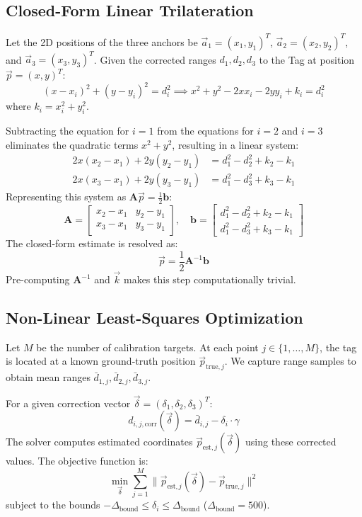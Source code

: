 \documentclass[11pt,a4paper]{article}
\begin{document}
\subsection{Closed-Form Linear Trilateration}
Let the 2D positions of the three anchors be $\vec{a}_1 = (x_1, y_1)^T$, $\vec{a}_2 = (x_2, y_2)^T$, and $\vec{a}_3 = (x_3, y_3)^T$. Given the corrected ranges $d_1, d_2, d_3$ to the Tag at position $\vec{p} = (x, y)^T$:
\begin{equation}
    (x - x_i)^2 + (y - y_i)^2 = d_i^2 \implies x^2 + y^2 - 2x x_i - 2y y_i + k_i = d_i^2
\end{equation}
where $k_i = x_i^2 + y_i^2$. 

Subtracting the equation for $i=1$ from the equations for $i=2$ and $i=3$ eliminates the quadratic terms $x^2 + y^2$, resulting in a linear system:
\begin{align}
    2x(x_2 - x_1) + 2y(y_2 - y_1) &= d_1^2 - d_2^2 + k_2 - k_1 \\
    2x(x_3 - x_1) + 2y(y_3 - y_1) &= d_1^2 - d_3^2 + k_3 - k_1
\end{align}
Representing this system as $\mathbf{A} \vec{p} = \frac{1}{2} \mathbf{b}$:
\begin{equation}
    \mathbf{A} = \begin{bmatrix} x_2 - x_1 & y_2 - y_1 \\ x_3 - x_1 & y_3 - y_1 \end{bmatrix}, \quad 
    \mathbf{b} = \begin{bmatrix} d_1^2 - d_2^2 + k_2 - k_1 \\ d_1^2 - d_3^2 + k_3 - k_1 \end{bmatrix}
\end{equation}
The closed-form estimate is resolved as:
\begin{equation}
    \vec{p} = \frac{1}{2} \mathbf{A}^{-1} \mathbf{b}
\end{equation}
Pre-computing $\mathbf{A}^{-1}$ and $\vec{k}$ makes this step computationally trivial.

\subsection{Non-Linear Least-Squares Optimization}
Let $M$ be the number of calibration targets. At each point $j \in \{1,\dots,M\}$, the tag is located at a known ground-truth position $\vec{p}_{\text{true}, j}$. We capture range samples to obtain mean ranges $\bar{d}_{1,j}, \bar{d}_{2,j}, \bar{d}_{3,j}$.

For a given correction vector $\vec{\delta} = (\delta_1, \delta_2, \delta_3)^T$:
\begin{equation}
    d_{i,j,\text{corr}}(\vec{\delta}) = \bar{d}_{i,j} - \delta_i \cdot \gamma
\end{equation}
The solver computes estimated coordinates $\vec{p}_{\text{est}, j}(\vec{\delta})$ using these corrected values. The objective function is:
\begin{equation}
    \min_{\vec{\delta}} \sum_{j=1}^{M} \| \vec{p}_{\text{est}, j}(\vec{\delta}) - \vec{p}_{\text{true}, j} \|^2
\end{equation}
subject to the bounds $-\Delta_{\text{bound}} \le \delta_i \le \Delta_{\text{bound}}$ ($\Delta_{\text{bound}} = 500$).
\end{document}
